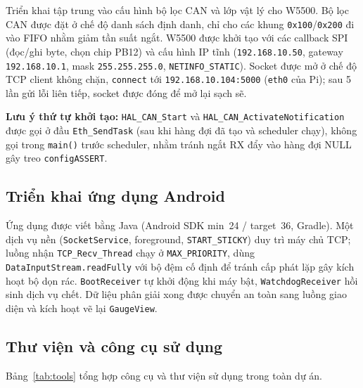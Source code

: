 \documentclass[../DoAn.tex]{subfiles}
\begin{document}
Triển khai tập trung vào cấu hình bộ lọc CAN và lớp vật lý cho W5500. Bộ lọc CAN
được đặt ở chế độ danh sách định danh, chỉ cho các khung \texttt{0x100}/\texttt{0x200}
đi vào FIFO nhằm giảm tần suất ngắt. W5500 được khởi tạo với các callback SPI
(đọc/ghi byte, chọn chip PB12) và cấu hình IP tĩnh
(\texttt{192.168.10.50}, gateway \texttt{192.168.10.1}, mask
\texttt{255.255.255.0}, \texttt{NETINFO\_STATIC}). Socket được mở ở chế độ TCP
client không chặn, \texttt{connect} tới \texttt{192.168.10.104:5000}
(\texttt{eth0} của Pi); sau 5 lần gửi lỗi liên tiếp, socket được đóng để mở lại
sạch sẽ.

\medskip
\noindent\textbf{Lưu ý thứ tự khởi tạo:} \texttt{HAL\_CAN\_Start} và
\texttt{HAL\_CAN\_ActivateNotification} được gọi ở đầu \texttt{Eth\_SendTask}
(sau khi hàng đợi đã tạo và scheduler chạy), không gọi trong \texttt{main()}
trước scheduler, nhằm tránh ngắt RX đẩy vào hàng đợi NULL gây treo
\texttt{configASSERT}.

\subsection{Triển khai ứng dụng Android}
\label{section:4.3.3}

Ứng dụng được viết bằng Java (Android SDK min~24 / target~36, Gradle). Một dịch
vụ nền (\texttt{SocketService}, foreground, \texttt{START\_STICKY}) duy trì máy
chủ TCP; luồng nhận \texttt{TCP\_Recv\_Thread} chạy ở \texttt{MAX\_PRIORITY},
dùng \texttt{DataInputStream.readFully} với bộ đệm cố định để tránh cấp phát lặp
gây kích hoạt bộ dọn rác. \texttt{BootReceiver} tự khởi động khi máy bật,
\texttt{WatchdogReceiver} hồi sinh dịch vụ chết. Dữ liệu phân giải xong được
chuyển an toàn sang luồng giao diện và kích hoạt vẽ lại \texttt{GaugeView}.

\subsection{Thư viện và công cụ sử dụng}
\label{section:4.3.4}

Bảng~\ref{tab:tools} tổng hợp công cụ và thư viện sử dụng trong toàn dự án.
\end{document}

